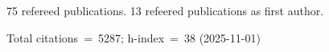 75 refereed publications. 13 refeered publications as first author.

Total citations~=~5287; h-index~=~38 (2025-11-01)